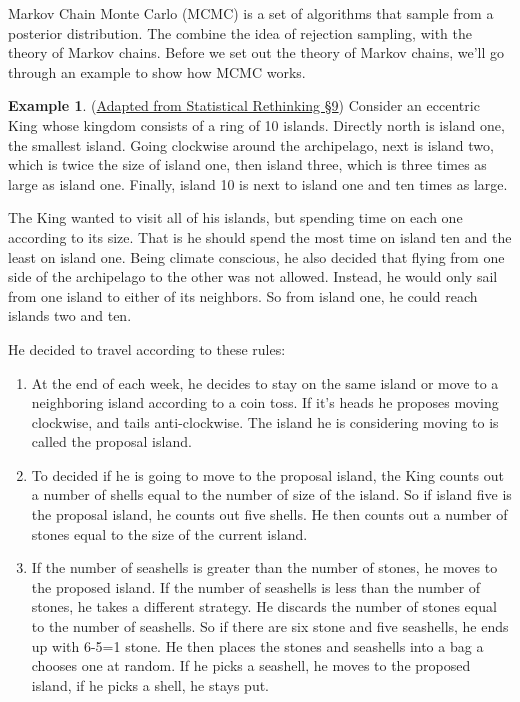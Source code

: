 \documentclass[
]{book}
\theoremstyle{definition}
\theoremstyle{definition}
\newtheorem{example}{Example}[chapter]
\theoremstyle{definition}
\theoremstyle{definition}
\theoremstyle{remark}
\begin{document}
Markov Chain Monte Carlo (MCMC) is a set of algorithms that sample from a posterior distribution. The combine the idea of rejection sampling, with the theory of Markov chains. Before we set out the theory of Markov chains, we'll go through an example to show how MCMC works.

\begin{example}
\protect\hypertarget{exm:King}{}\label{exm:King}(\href{https://xcelab.net/rm/statistical-rethinking/}{Adapted from Statistical Rethinking \S 9}) Consider an eccentric King whose kingdom consists of a ring of 10 islands. Directly north is island one, the smallest island. Going clockwise around the archipelago, next is island two, which is twice the size of island one, then island three, which is three times as large as island one. Finally, island 10 is next to island one and ten times as large.

The King wanted to visit all of his islands, but spending time on each one according to its size. That is he should spend the most time on island ten and the least on island one. Being climate conscious, he also decided that flying from one side of the archipelago to the other was not allowed. Instead, he would only sail from one island to either of its neighbors. So from island one, he could reach islands two and ten.

He decided to travel according to these rules:

\begin{enumerate}
\def\labelenumi{\arabic{enumi}.}
\item
  At the end of each week, he decides to stay on the same island or move to a neighboring island according to a coin toss. If it's heads he proposes moving clockwise, and tails anti-clockwise. The island he is considering moving to is called the proposal island.
\item
  To decided if he is going to move to the proposal island, the King counts out a number of shells equal to the number of size of the island. So if island five is the proposal island, he counts out five shells. He then counts out a number of stones equal to the size of the current island.
\item
  If the number of seashells is greater than the number of stones, he moves to the proposed island. If the number of seashells is less than the number of stones, he takes a different strategy. He discards the number of stones equal to the number of seashells. So if there are six stone and five seashells, he ends up with 6-5=1 stone. He then places the stones and seashells into a bag a chooses one at random. If he picks a seashell, he moves to the proposed island, if he picks a shell, he stays put.
\end{enumerate}


\end{example}
\end{document}
